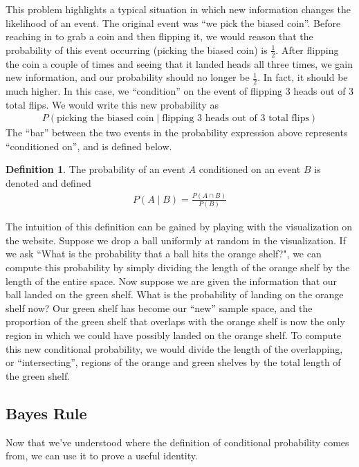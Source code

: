 \documentclass{tufte-book}
\theoremstyle{definition}
\numberwithin{theorem}{section}
\newtheorem{definition}[theorem]{Definition}
\numberwithin{definition}{section}
\numberwithin{lemma}{section}
\numberwithin{corollary}{section}
\numberwithin{proposition}{section}
\numberwithin{remark}{section}
\numberwithin{claim}{section}
\numberwithin{observation}{section}
\numberwithin{fact}{section}
\numberwithin{assumption}{section}
\numberwithin{example}{section}
\numberwithin{exercise}{section}
\begin{document}
This problem highlights a typical situation in which new information changes the likelihood of an event. The original event was ``we pick the biased coin''. Before reaching in to grab a coin and then flipping it, we would reason that the probability of this event occurring (picking the biased coin) is $\frac{1}{2}$. After flipping the coin a couple of times and seeing that it landed heads all three times, we gain new information, and our probability should no longer be $\frac{1}{2}$. In fact, it should be much higher. In this case, we ``condition'' on the event of flipping 3 heads out of 3 total flips. We would write this new probability as
\begin{align*}
P(\text{picking the biased coin} \mid \text{flipping 3 heads out of 3 total flips})
\end{align*}
The ``bar'' between the two events in the probability expression above represents ``conditioned on'', and is defined below.
\begin{definition}
The probability of an event $A$ conditioned on an event $B$ is denoted and defined
\begin{align*}
P(A \mid B) = \frac{P(A \cap B)}{P(B)}
\end{align*}
\end{definition}
The intuition of this definition can be gained by playing with the visualization on the website. Suppose we drop a ball uniformly at random in the visualization. If we ask ``What is the probability that a ball hits the orange shelf?", we can compute this probability by simply dividing the length of the orange shelf by the length of the entire space. Now suppose we are given the information that our ball landed on the green shelf. What is the probability of landing on the orange shelf now? Our green shelf has become our ``new'' sample space, and the proportion of the green shelf that overlaps with the orange shelf is now the only region in which we could have possibly landed on the orange shelf. To compute this new conditional probability, we would divide the length of the overlapping, or ``intersecting'', regions of the orange and green shelves by the total length of the green shelf.

\subsection{Bayes Rule}
Now that we've understood where the definition of conditional probability comes from, we can use it to prove a useful identity.
\end{document}

